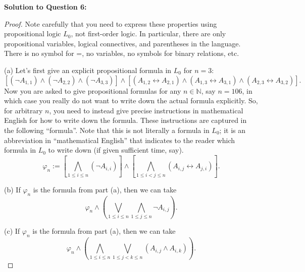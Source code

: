 \documentclass{article}
\begin{document}
\textbf{Solution to Question 6:}
\begin{proof}
Note carefully that you need to express these properties using propositional logic \(L_0\), not first-order logic. In particular, there are only propositional variables, logical connectives, and parentheses in the language. There is no symbol for =, no variables, no symbols for binary relations, etc.

(a) Let’s first give an explicit propositional formula in \(L_0\) for \(n = 3\):
\[
[(\neg A_{1,1}) \land (\neg A_{2,2}) \land (\neg A_{3,3})] \land [(A_{1,2} \leftrightarrow A_{2,1}) \land (A_{1,3} \leftrightarrow A_{3,1}) \land (A_{2,3} \leftrightarrow A_{3,2})].
\]
Now you are asked to give propositional formulas for any \(n \in \mathbb{N}\), say \(n = 106\), in which case you really do not want to write down the actual formula explicitly. So, for arbitrary \(n\), you need to instead give precise instructions in mathematical English for how to write down the formula. These instructions are captured in the following “formula”. Note that this is not literally a formula in \(L_0\); it is an abbreviation in “mathematical English” that indicates to the reader which formula in \(L_0\) to write down (if given sufficient time, say).
\[
\varphi_n := \left[\bigwedge_{1 \leq i \leq n} (\neg A_{i,i}) \right] \land \left[\bigwedge_{1 \leq i < j \leq n} (A_{i,j} \leftrightarrow A_{j,i}) \right].
\]

(b) If \(\varphi_n\) is the formula from part (a), then we can take
\[
\varphi_n \land \left(\bigvee_{1 \leq i \leq n} \bigwedge_{1 \leq j \leq n} \neg A_{i,j} \right).
\]

(c) If \(\varphi_n\) is the formula from part (a), then we can take
\[
\varphi_n \land \left(\bigwedge_{1 \leq i \leq n} \bigvee_{1 \leq j < k \leq n} (A_{i,j} \land A_{i,k}) \right).
\]
\end{proof}
\end{document}
